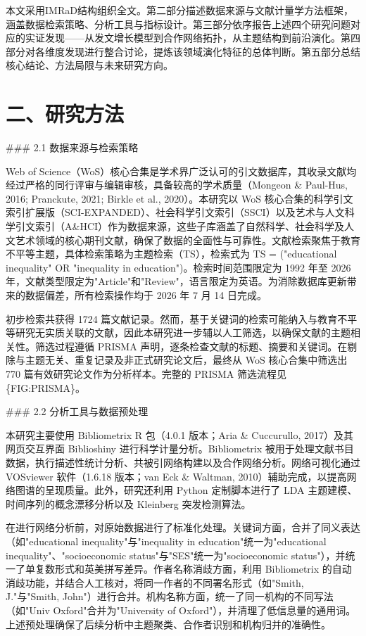 \documentclass[12pt,a4paper]{article}
\begin{document}
本文采用IMRaD结构组织全文。第二部分描述数据来源与文献计量学方法框架，涵盖数据检索策略、分析工具与指标设计。第三部分依序报告上述四个研究问题对应的实证发现——从发文增长模型到合作网络拓扑，从主题结构到前沿演化。第四部分对各维度发现进行整合讨论，提炼该领域演化特征的总体判断。第五部分总结核心结论、方法局限与未来研究方向。

\section{二、研究方法}

\#\#\# 2.1 数据来源与检索策略

Web of Science（WoS）核心合集是学术界广泛认可的引文数据库，其收录文献均经过严格的同行评审与编辑审核，具备较高的学术质量（Mongeon \& Paul-Hus, 2016; Pranckute, 2021; Birkle et al., 2020）。本研究以 WoS 核心合集的科学引文索引扩展版（SCI-EXPANDED）、社会科学引文索引（SSCI）以及艺术与人文科学引文索引（A\&HCI）作为数据来源，这些子库涵盖了自然科学、社会科学及人文艺术领域的核心期刊文献，确保了数据的全面性与可靠性。文献检索聚焦于教育不平等主题，具体检索策略为主题检索（TS），检索式为 TS = ("educational inequality" OR "inequality in education")。检索时间范围限定为 1992 年至 2026 年，文献类型限定为"Article"和"Review"，语言限定为英语。为消除数据库更新带来的数据偏差，所有检索操作均于 2026 年 7 月 14 日完成。

初步检索共获得 1724 篇文献记录。然而，基于关键词的检索可能纳入与教育不平等研究无实质关联的文献，因此本研究进一步辅以人工筛选，以确保文献的主题相关性。筛选过程遵循 PRISMA 声明，逐条检查文献的标题、摘要和关键词。在剔除与主题无关、重复记录及非正式研究论文后，最终从 WoS 核心合集中筛选出 770 篇有效研究论文作为分析样本。完整的 PRISMA 筛选流程见\{FIG:PRISMA\}。

\#\#\# 2.2 分析工具与数据预处理

本研究主要使用 Bibliometrix R 包（4.0.1 版本；Aria \& Cuccurullo, 2017）及其网页交互界面 Biblioshiny 进行科学计量分析。Bibliometrix 被用于处理文献书目数据，执行描述性统计分析、共被引网络构建以及合作网络分析。网络可视化通过 VOSviewer 软件（1.6.18 版本；van Eck \& Waltman, 2010）辅助完成，以提高网络图谱的呈现质量。此外，研究还利用 Python 定制脚本进行了 LDA 主题建模、时间序列的概念漂移分析以及 Kleinberg 突发检测算法。

在进行网络分析前，对原始数据进行了标准化处理。关键词方面，合并了同义表达（如"educational inequality"与"inequality in education"统一为"educational inequality"、"socioeconomic status"与"SES"统一为"socioeconomic status"），并统一了单复数形式和英美拼写差异。作者名称消歧方面，利用 Bibliometrix 的自动消歧功能，并结合人工核对，将同一作者的不同署名形式（如"Smith, J."与"Smith, John"）进行合并。机构名称方面，统一了同一机构的不同写法（如"Univ Oxford"合并为"University of Oxford"），并清理了低信息量的通用词。上述预处理确保了后续分析中主题聚类、合作者识别和机构归并的准确性。
\end{document}
